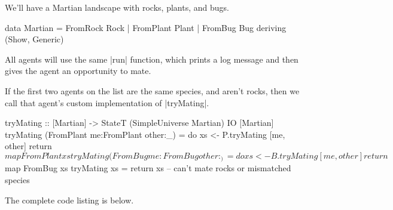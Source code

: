 We'll have a Martian landscape with rocks, plants, and bugs.

\begin{code}
data Martian = FromRock Rock | FromPlant Plant | FromBug Bug
  deriving (Show, Generic)
\end{code}

All agents will use the same |run| function,
which prints a log message and then 
gives the agent an opportunity to mate.


If the first two agents on the list are the same species,
and aren't rocks, then we call that agent's custom implementation of
|tryMating|.

\begin{code}
tryMating :: [Martian] -> StateT (SimpleUniverse Martian) IO [Martian]
tryMating (FromPlant me:FromPlant other:_) = do
    xs <- P.tryMating [me, other]
    return $ map FromPlant xs
tryMating (FromBug me:FromBug other:_) = do
    xs <- B.tryMating [me, other]
    return $ map FromBug xs
tryMating xs = return xs -- can't mate rocks or mismatched species
\end{code}

The complete code listing is below.

